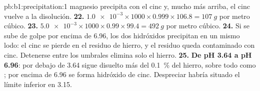 \begin{solution}{pb:b1:precipitation:1}
magnesio precipita con el cinc y, mucho más arriba, el cinc vuelve a la
disolución.
\textbf{22.} $\num{1.0e-3} \times 1000 \times 0.999 \times 106.8 =
\qty{107}{g}$ por metro cúbico.
\textbf{23.} $\num{5.0e-3} \times 1000 \times 0.99 \times 99.4 =
\qty{492}{g}$ por metro cúbico.
\textbf{24.} Si se sube de golpe por encima de 6.96, los dos hidróxidos
precipitan en un mismo lodo: el cinc se pierde en el residuo de hierro, y
el residuo queda contaminado con cinc. Detenerse entre los umbrales
elimina solo el hierro.
\textbf{25.} \textbf{De pH 3.64 a pH 6.96}: por debajo de 3.64 sigue
disuelto más del \qty{0.1}{\percent} del hierro, sobre todo como
; por encima de 6.96 se forma hidróxido de cinc. Despreciar
 habría situado el límite inferior en 3.15.
\end{solution}
